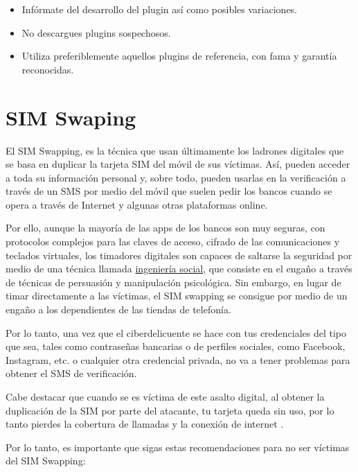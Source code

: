 \documentclass[
  a4paper,
  openany]{book}
\begin{document}
\begin{itemize}
\item
  Infórmate del desarrollo del plugin así como posibles variaciones.
\item
  No descargues plugins sospechosos.
\item
  Utiliza preferiblemente aquellos plugins de referencia, con fama y garantía reconocidas.
\end{itemize}

\hypertarget{sim-swaping}{%
\section{SIM Swaping}\label{sim-swaping}}

El SIM Swapping, es la técnica que usan últimamente los ladrones digitales que se basa en duplicar la tarjeta SIM del móvil de sus víctimas. Así, pueden acceder a toda su información personal y, sobre todo, pueden usarlas en la verificación a través de un SMS por medio del móvil que suelen pedir los bancos cuando se opera a través de Internet y algunas otras plataformas online.

Por ello, aunque la mayoría de las apps de los bancos son muy seguras, con protocolos complejos para las claves de acceso, cifrado de las comunicaciones y teclados virtuales, los timadores digitales son capaces de saltarse la seguridad por medio de una técnica llamada \href{https://es.wikipedia.org/wiki/Ingeniería_social_(seguridad_informática)}{ingeniería social}, que consiste en el engaño a través de técnicas de persuasión y manipulación psicológica. Sin embargo, en lugar de timar directamente a las víctimas, el SIM swapping se consigue por medio de un engaño a los dependientes de las tiendas de telefonía.

Por lo tanto, una vez que el ciberdelicuente se hace con tus credenciales del tipo que sea, tales como contraseñas bancarias o de perfiles sociales, como Facebook, Instagram, etc. o cualquier otra credencial privada, no va a tener problemas para obtener el SMS de verificación.

Cabe destacar que cuando se es víctima de este asalto digital, al obtener la duplicación de la SIM por parte del atacante, tu tarjeta queda sin uso, por lo tanto pierdes la cobertura de llamadas y la conexión de internet \citep{PANDA-sim}.

Por lo tanto, es importante que sigas estas recomendaciones para no ser víctimas del SIM Swapping:
\end{document}
